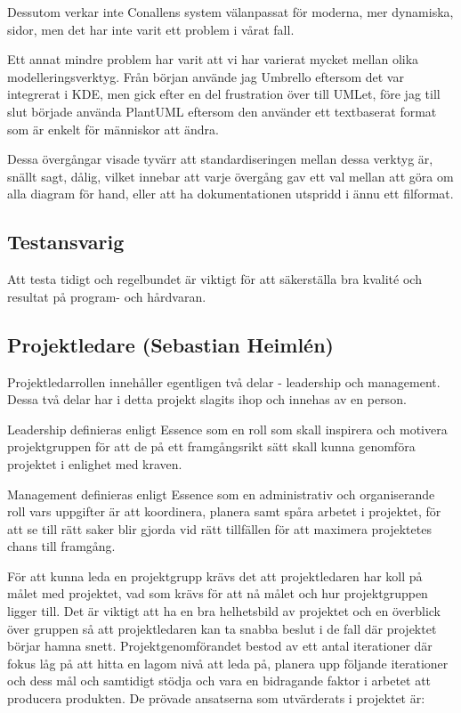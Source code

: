 \documentclass[conference,a4paper]{IEEEtran}
\begin{document}
Dessutom verkar inte Conallens system\cite{Conallen99} välanpassat för moderna, mer dynamiska,
sidor, men det har inte varit ett problem i vårat fall. 

Ett annat mindre problem har varit att vi har varierat mycket mellan olika modelleringsverktyg.
Från början använde jag Umbrello\cite{Umbrello} eftersom det var integrerat i KDE, men gick efter
en del frustration över till UMLet\cite{UMLet}, före jag till slut började använda
PlantUML\cite{PlantUML} eftersom den använder ett textbaserat format som är enkelt för människor att ändra.

Dessa övergångar visade tyvärr att standardiseringen mellan dessa verktyg är, snällt sagt, dålig,
vilket innebar att varje övergång gav ett val mellan att göra om alla diagram för hand, eller att
ha dokumentationen utspridd i ännu ett filformat.

\subsection{Testansvarig}
Att testa tidigt och regelbundet är viktigt för att säkerställa bra kvalité och resultat på program- och hårdvaran. 

\subsection{Projektledare (Sebastian Heimlén)}
Projektledarrollen innehåller egentligen två delar - leadership och management. Dessa två delar har i detta projekt slagits ihop och innehas av en person.

Leadership definieras enligt Essence \cite{ivarjacobson2017} som en roll som skall inspirera och motivera projektgruppen för att de på ett framgångsrikt sätt skall kunna genomföra projektet i enlighet med kraven.

Management definieras enligt Essence \cite{ivarjacobson2017} som en administrativ och organiserande roll vars uppgifter är att koordinera, planera samt spåra arbetet i projektet, för att se till rätt saker blir gjorda vid rätt tillfällen för att maximera projektetes chans till framgång.

För att kunna leda en projektgrupp krävs det att projektledaren har koll på målet med projektet, vad som krävs för att nå målet och hur projektgruppen ligger till. Det är viktigt att ha en bra helhetsbild av projektet och en överblick över gruppen så att projektledaren kan ta snabba beslut i de fall där projektet börjar hamna snett. Projektgenomförandet bestod av ett antal iterationer där fokus låg på att hitta en lagom nivå att leda på, planera upp följande iterationer och dess mål och samtidigt stödja och vara en bidragande faktor i arbetet att producera produkten. De prövade ansatserna som utvärderats i projektet är:
\end{document}
